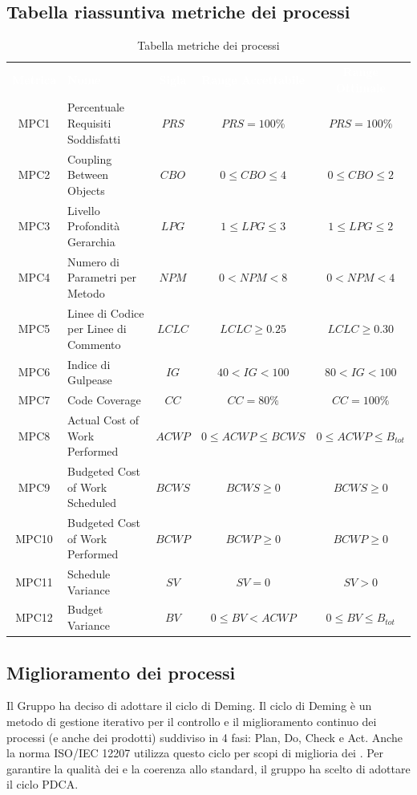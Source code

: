 \subsection{Tabella riassuntiva metriche dei processi}
    \renewcommand{\arraystretch}{1.5}
    \begin{longtable}{ c C{4cm} c c c}
    \caption{Tabella metriche dei processi}\\
    \textcolor{white}{\textbf{Metrica}} & \textcolor{white}{\textbf{Nome}} & \textcolor{white}{\textbf{Sigla}} & \textcolor{white}{\textbf{Range Accettabile}} & \textcolor{white}{\textbf{Range Ottimale}}\\
    MPC1 & Percentuale Requisiti Soddisfatti & $PRS$ & $PRS = 100\%$ & $PRS = 100\%$ \\
    MPC2 & Coupling Between Objects & $CBO$ & $0 \leq CBO \leq 4$ & $0 \leq CBO \leq 2$ \\
    MPC3 & Livello Profondità Gerarchia & $LPG$ &  $1 \leq LPG \leq 3$ &  $1 \leq LPG \leq 2$ \\
    MPC4 & Numero di Parametri per Metodo & $NPM$ & $0 < NPM < 8$ & $ 0 < NPM < 4$ \\
    MPC5 & Linee di Codice per Linee di Commento & $LCLC$ & $LCLC \geq 0.25$ & $LCLC \geq 0.30$ \\
    MPC6 & Indice di Gulpease & $IG$ & $40 < IG < 100$ & $80 < IG < 100$ \\
    MPC7 & Code Coverage & $CC$ & $CC = 80\%$ & $CC = 100\%$  \\
    MPC8 & Actual Cost of Work Performed & $ACWP$ & $0 \leq ACWP \leq BCWS$ & $0 \leq ACWP \leq B_{tot}$ \\
    MPC9 & Budgeted Cost of Work Scheduled & $BCWS$ & $BCWS \geq 0$ &  $BCWS \geq 0$ \\
    MPC10 & Budgeted Cost of Work Performed & $BCWP$ & $BCWP \geq 0$ & $BCWP \geq 0$ \\
    MPC11 & Schedule Variance & $SV$ & $SV = 0$ & $SV > 0$  \\	
    MPC12 & Budget Variance & $BV$ & $0 \leq BV < ACWP$ & $0 \leq BV \leq B_{tot}$  \\
    \end{longtable}
\newpage
\subsection{Miglioramento dei processi}
Il Gruppo \Gruppo{} ha deciso di adottare il ciclo di Deming. Il ciclo di Deming è un metodo di gestione iterativo per il controllo e il miglioramento continuo dei processi (e anche dei prodotti) suddiviso in 4 fasi: Plan, Do, Check e Act. 
Anche la norma ISO/IEC 12207 utilizza questo ciclo per scopi di miglioria dei . Per garantire la qualità dei  e la coerenza allo standard, il gruppo \Gruppo{}  
ha scelto di adottare il ciclo PDCA.


